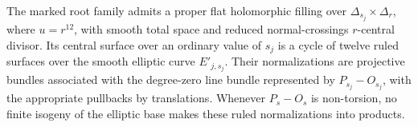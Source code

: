 \begin{proposition}\hypertarget{tag-0300}{}\label{push:src:B.1.1}\label{push:B11}

The marked root family admits a proper flat holomorphic filling over
$\Delta_{s_j}\times\Delta_r$, where $u=r^{12}$, with smooth
total space and reduced normal-crossings $r$-central divisor.
Its central surface over an ordinary value of $s_j$ is a cycle
of twelve ruled surfaces over the smooth elliptic curve
$E'_{j,s_j}$. Their normalizations are projective bundles
associated with the degree-zero line bundle represented by
$P_{s_j}-O_{s_j}$, with the appropriate pullbacks by translations.
Whenever $P_s-O_s$ is non-torsion, no finite isogeny of the
elliptic base makes these ruled normalizations into products.
\end{proposition}



